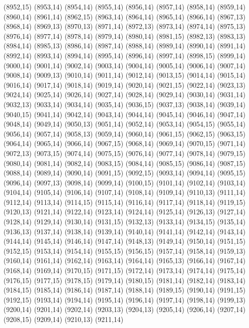 (8952,15)
(8953,14)
(8954,14)
(8955,14)
(8956,14)
(8957,14)
(8958,14)
(8959,14)
(8960,14)
(8961,14)
(8962,15)
(8963,14)
(8964,14)
(8965,14)
(8966,14)
(8967,13)
(8968,14)
(8969,13)
(8970,13)
(8971,14)
(8972,13)
(8973,14)
(8974,14)
(8975,13)
(8976,14)
(8977,14)
(8978,14)
(8979,14)
(8980,14)
(8981,15)
(8982,13)
(8983,13)
(8984,14)
(8985,13)
(8986,14)
(8987,14)
(8988,14)
(8989,14)
(8990,14)
(8991,14)
(8992,14)
(8993,14)
(8994,14)
(8995,14)
(8996,14)
(8997,14)
(8998,15)
(8999,14)
(9000,14)
(9001,14)
(9002,14)
(9003,14)
(9004,14)
(9005,14)
(9006,14)
(9007,14)
(9008,14)
(9009,13)
(9010,14)
(9011,14)
(9012,14)
(9013,15)
(9014,14)
(9015,14)
(9016,14)
(9017,14)
(9018,14)
(9019,14)
(9020,14)
(9021,15)
(9022,14)
(9023,13)
(9024,14)
(9025,14)
(9026,14)
(9027,14)
(9028,14)
(9029,14)
(9030,14)
(9031,14)
(9032,13)
(9033,14)
(9034,14)
(9035,14)
(9036,15)
(9037,13)
(9038,14)
(9039,14)
(9040,15)
(9041,14)
(9042,14)
(9043,14)
(9044,14)
(9045,14)
(9046,14)
(9047,14)
(9048,14)
(9049,14)
(9050,13)
(9051,14)
(9052,14)
(9053,14)
(9054,15)
(9055,14)
(9056,14)
(9057,14)
(9058,13)
(9059,14)
(9060,14)
(9061,15)
(9062,15)
(9063,15)
(9064,14)
(9065,14)
(9066,14)
(9067,15)
(9068,14)
(9069,14)
(9070,15)
(9071,14)
(9072,13)
(9073,15)
(9074,14)
(9075,15)
(9076,14)
(9077,14)
(9078,14)
(9079,15)
(9080,14)
(9081,14)
(9082,14)
(9083,15)
(9084,14)
(9085,15)
(9086,14)
(9087,15)
(9088,14)
(9089,14)
(9090,14)
(9091,15)
(9092,15)
(9093,14)
(9094,14)
(9095,15)
(9096,14)
(9097,13)
(9098,14)
(9099,14)
(9100,15)
(9101,14)
(9102,14)
(9103,14)
(9104,14)
(9105,14)
(9106,14)
(9107,14)
(9108,14)
(9109,14)
(9110,13)
(9111,14)
(9112,14)
(9113,14)
(9114,15)
(9115,14)
(9116,14)
(9117,14)
(9118,14)
(9119,15)
(9120,13)
(9121,14)
(9122,14)
(9123,14)
(9124,14)
(9125,14)
(9126,13)
(9127,14)
(9128,14)
(9129,14)
(9130,14)
(9131,15)
(9132,13)
(9133,14)
(9134,15)
(9135,14)
(9136,13)
(9137,14)
(9138,14)
(9139,14)
(9140,14)
(9141,14)
(9142,14)
(9143,14)
(9144,14)
(9145,14)
(9146,14)
(9147,14)
(9148,13)
(9149,14)
(9150,14)
(9151,15)
(9152,15)
(9153,14)
(9154,14)
(9155,15)
(9156,15)
(9157,14)
(9158,14)
(9159,13)
(9160,14)
(9161,14)
(9162,14)
(9163,14)
(9164,14)
(9165,13)
(9166,14)
(9167,14)
(9168,14)
(9169,14)
(9170,15)
(9171,15)
(9172,14)
(9173,14)
(9174,14)
(9175,14)
(9176,15)
(9177,15)
(9178,15)
(9179,14)
(9180,15)
(9181,14)
(9182,14)
(9183,14)
(9184,15)
(9185,14)
(9186,14)
(9187,14)
(9188,14)
(9189,15)
(9190,14)
(9191,15)
(9192,15)
(9193,14)
(9194,14)
(9195,14)
(9196,14)
(9197,14)
(9198,14)
(9199,13)
(9200,14)
(9201,14)
(9202,14)
(9203,13)
(9204,13)
(9205,14)
(9206,14)
(9207,14)
(9208,15)
(9209,14)
(9210,13)
(9211,14)
